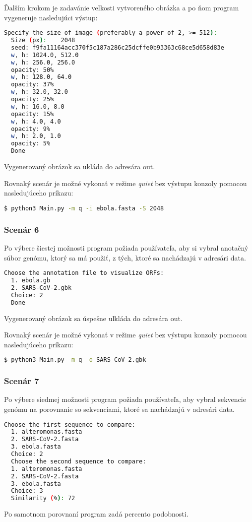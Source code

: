 Ďalším krokom je zadavánie veľkosti vytvoreného obrázka a po ňom program vygeneruje nasledujúci výstup:
\begin{lstlisting}[language=bash]
  Specify the size of image (preferably a power of 2, >= 512):
  Size (px):	2048
  seed: f9fa11164acc370f5c187a286c25dcffe0b93363c68ce5d658d83e
  w, h: 1024.0, 512.0
  w, h: 256.0, 256.0
  opacity: 50%
  w, h: 128.0, 64.0
  opacity: 37%
  w, h: 32.0, 32.0
  opacity: 25%
  w, h: 16.0, 8.0
  opacity: 15%
  w, h: 4.0, 4.0
  opacity: 9%
  w, h: 2.0, 1.0
  opacity: 5%
  Done
\end{lstlisting}

Vygenerovaný obrázok sa ukláda do adresára {\selectfont out}.

\bigskip
Rovnaký scenár je možné vykonať v režime \textit{quiet} bez výstupu konzoly pomocou nasledujúceho príkazu:
\begin{lstlisting}[language=bash]
  $ python3 Main.py -m q -i ebola.fasta -S 2048
\end{lstlisting}



\subsubsection{Scenár 6}
Po výbere šiestej možnosti program požiada používateľa, aby si vybral anotačný súbor genómu, ktorý sa má použiť, z tých, ktoré sa nachádzajú v adresári {\selectfont data}.
\begin{lstlisting}[language=bash]
  Choose the annotation file to visualize ORFs:
  1. ebola.gb
  2. SARS-CoV-2.gbk
  Choice: 2
  Done  
\end{lstlisting}
Vygenerovaný obrázok sa úspešne ulkláda do adresára {\selectfont out}.

\bigskip
Rovnaký scenár je možné vykonať v režime \textit{quiet} bez výstupu konzoly pomocou nasledujúceho príkazu:
\begin{lstlisting}[language=bash]
  $ python3 Main.py -m q -o SARS-CoV-2.gbk
\end{lstlisting}



\subsubsection{Scenár 7}
Po výbere siedmej možnosti program požiada používateľa, aby vybral sekvencie genómu na porovnanie so sekvenciami, ktoré sa nachádzajú v adresári {\selectfont data}.
\begin{lstlisting}[language=bash]
  Choose the first sequence to compare:
  1. alteromonas.fasta
  2. SARS-CoV-2.fasta
  3. ebola.fasta
  Choice: 2
  Choose the second sequence to compare:
  1. alteromonas.fasta
  2. SARS-CoV-2.fasta
  3. ebola.fasta
  Choice: 3
  Similarity (%): 72  
\end{lstlisting}
Po samotnom porovnaní program zadá percento podobnosti.

